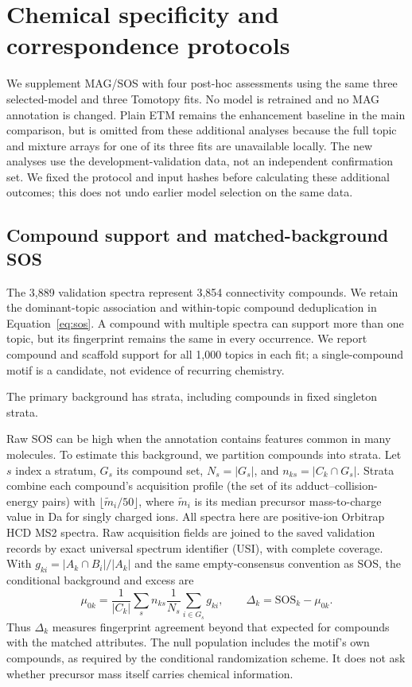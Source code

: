 \documentclass[10pt,a4paper]{article}
\begin{document}
\section{Chemical specificity and correspondence protocols}
\label{sec:chemical-assessment}

We supplement MAG/SOS with four post-hoc assessments using the same three
selected-model and three Tomotopy fits. No model is retrained and no MAG
annotation is changed. Plain ETM remains the enhancement baseline in the
main comparison, but is omitted from these additional analyses because the
full topic and mixture arrays for one of its three fits are unavailable
locally. The new analyses use the development-validation data, not an
independent confirmation set. We fixed the protocol and input hashes before
calculating these additional outcomes; this does not undo earlier model
selection on the same data.

\subsection{Compound support and matched-background SOS}
\label{sec:background}

The 3,889 validation spectra represent 3,854 connectivity compounds. We retain
the dominant-topic association and within-topic compound deduplication in
Equation~\ref{eq:sos}. A compound with multiple spectra can support more than
one topic, but its fingerprint remains the same in every occurrence. We
report compound and scaffold support for all 1,000 topics in each fit;
a single-compound motif is a candidate, not evidence of recurring chemistry.

The primary background has \ChemPrimaryStrata{} strata, including
\ChemFixedCompounds{} compounds in fixed singleton strata.

Raw SOS can be high when the annotation contains features common in many
molecules. To estimate this background, we partition compounds into strata.
Let $s$ index a stratum, $G_s$ its compound set, $N_s=|G_s|$, and
$n_{ks}=|C_k\cap G_s|$. Strata combine each compound's acquisition profile
(the set of its adduct--collision-energy pairs) with
$\lfloor\widetilde m_i/50\rfloor$, where $\widetilde m_i$ is its median
precursor mass-to-charge value in Da for singly charged ions. All spectra
here are positive-ion Orbitrap HCD MS2 spectra. Raw acquisition fields are
joined to the saved validation records by exact universal spectrum identifier
(USI), with complete coverage.
With $g_{ki}=|A_k\cap B_i|/|A_k|$ and the same empty-consensus convention as
SOS, the conditional background and excess are
\begin{equation}
 \mu_{0k}=\frac{1}{|C_k|}\sum_s n_{ks}
             \frac{1}{N_s}\sum_{i\in G_s}g_{ki},
 \qquad \Delta_k=\mathrm{SOS}_k-\mu_{0k}.
 \label{eq:sos-excess}
\end{equation}
Thus $\Delta_k$ measures fingerprint agreement beyond that expected for
compounds with the matched attributes. The null population includes the
motif's own compounds, as required by the conditional randomization scheme.
It does not ask whether precursor mass itself carries chemical information.
\end{document}

